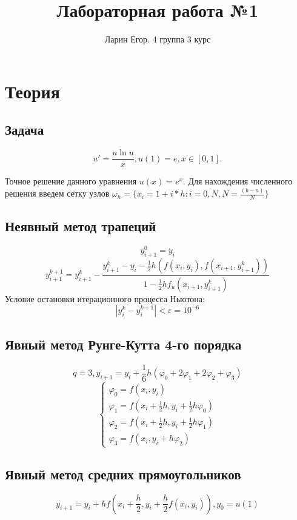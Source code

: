 \documentclass{article}
\title{Лабораторная работа №1}
\author{Ларин Егор. 4 группа 3 курс}
\begin{document}
\maketitle
\section*{Теория}
\subsection*{Задача}
\begin{equation*}
    u' = \frac{u \ln u}{x}, u(1) = e, x \in \left[0, 1\right].
\end{equation*}

Точное решение данного уравнения $u(x) = e^x$.
Для нахождения численного решения введем сетку узлов $ \omega_h = \{x_i = 1 + i
* h : i = \overline{0, N}, N = \frac{(b-a)}{N} \} $ 

\subsection*{Неявный метод трапеций}
\[
    y_{i+1}^0 = y_i
\]
\[
    y_{i+1}^{k+1} = y_{i+1}^k - \frac{y^k_{i+1} - y_i - \frac{1}{2} h (f(x_i,
    y_i), f(x_{i+1}, y^k_{i+1})) }{1- \frac{1}{2} h f_u(x_{i+1}, y^k_{i+1})}
\]
Условие остановки итерационного процесса Ньютона:
\[
    \left|y_i^k - y_i^{k+1} \right| < \varepsilon = 10^{-6}
\]


\subsection*{Явный метод Рунге-Кутта 4-го порядка}
\[
    q = 3, y_{i+1} = y_i + \frac{1}{6}h(\varphi_0 + 2 \varphi_1 + 2\varphi_2 + \varphi_3)
\]
\[
    \begin{cases}
       \varphi_0 = f(x_i, y_i) \\
       \varphi_1 = f(x_i + \frac{1}{2}h, y_i + \frac{1}{2} h \varphi_0) \\
       \varphi_2 = f(x_i + \frac{1}{2}h, y_i + \frac{1}{2} h \varphi_1) \\
       \varphi_3 = f(x_i, y_i + h \varphi_2)
    \end{cases}
\]
\subsection*{Явный метод средних прямоугольников}
\[
    y_{i+1} = y_i + h f(x_i + \frac{h}{2}, y_i + \frac{h}{2}f(x_i, y_i)), y_0 = u(1)
\]
\end{document}
